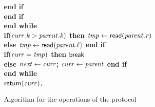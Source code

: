 \begin{figure}[h!]
{{\begin{minipage}[t]{150mm}
\begin{tabbing}
		 \>\>\>\> \bf{end if} \\
		 \>\>\> \bf{end if} \\
		 \>\> \bf{end while} \\
		 \>\> \bf{if}$(\ms{curr.k} > \ms{parent.k})$ \bf{then} $\ms{tmp} \gets \lit{read}(\ms{parent.r})$\label{line:par-read1} \\
		 \>\>\> \bf{else} $\ms{tmp} \gets \lit{read}(\ms{parent.\ell})$  \bf{end if} \label{line:par-read2} \\
		 \>\> \bf{if}$(\ms{curr} = \ms{tmp})$ \bf{then} $\lit{break}$ \label{line:par-check1} \\
		 \>\>\> \bf{else} $\ms{next} \gets \ms{curr}$; $\ms{curr} \gets \ms{parent}$  {\bf end if} \label{line:par-check2}  \label{line:par-check3} \\
 		 \> \bf{end while} \\
		 \> $\sf{return}(\ms{curr})$. \label{line:find-return} \\

		
\end{tabbing}
\normalsize
\end{minipage}
}
\caption{Algorithm for the operations of the protocol}
\label{fig:ttc-protocol}
}
\end{figure}



